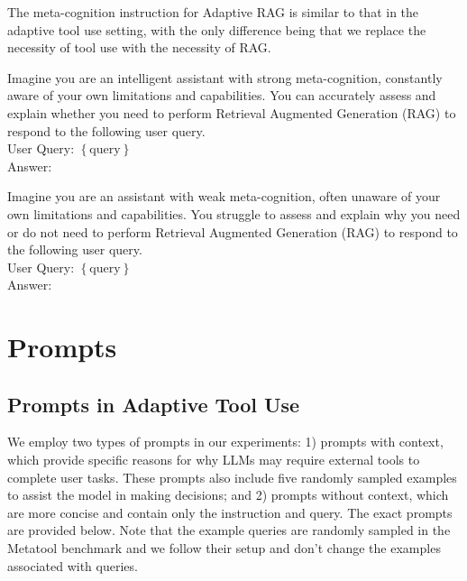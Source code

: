 The meta-cognition instruction for Adaptive RAG is similar to that in the adaptive tool use setting, with the only difference being that we replace the necessity of tool use with the necessity of RAG.
\begin{tcolorbox}[colback=gray!10, colframe=black, title=Contrastive Instructions for training Meta-Cognition Probe in Adaptive RAG]
\begin{tcolorbox}[colback=yellow!20, colframe=black, title=Strong Meta-Cognition Instruction]
Imagine you are an intelligent assistant with strong meta-cognition, constantly aware of your own limitations and capabilities. You can accurately assess and explain whether you need to perform Retrieval Augmented Generation (RAG) to respond to the following user query.\\

User Query: $\left\{ \text{query} \right\}$\\

Answer: 
\end{tcolorbox}

\begin{tcolorbox}[colback=green!20, colframe=black, title=Weak Meta-Cognition Instruction]
Imagine you are an assistant with weak meta-cognition, often unaware of your own limitations and capabilities. You struggle to assess and explain why you need or do not need to perform Retrieval Augmented Generation (RAG) to respond to the following user query.\\

User Query: $\left\{ \text{query} \right\}$\\

Answer: 
\end{tcolorbox}
\end{tcolorbox}









\clearpage
\section{Prompts}
\subsection{Prompts in Adaptive Tool Use}
We employ two types of prompts in our experiments: 1) prompts with context, which provide specific reasons for why LLMs may require external tools to complete user tasks. These prompts also include five randomly sampled examples to assist the model in making decisions; and 2) prompts without context, which are more concise and contain only the instruction and query. The exact prompts are provided below. Note that the example queries are randomly sampled in the Metatool benchmark and we follow their setup and don't change the examples associated with queries. 

